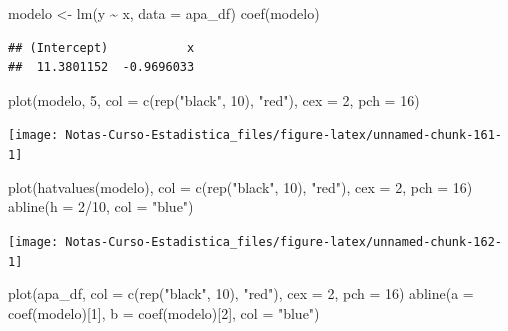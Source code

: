 \documentclass[
  12pt,
]{book}
\newenvironment{Shaded}{\begin{snugshade}}{\end{snugshade}}
\newcommand{\AttributeTok}[1]{\textcolor[rgb]{0.77,0.63,0.00}{#1}}
\newcommand{\DecValTok}[1]{\textcolor[rgb]{0.00,0.00,0.81}{#1}}
\newcommand{\FunctionTok}[1]{\textcolor[rgb]{0.00,0.00,0.00}{#1}}
\newcommand{\NormalTok}[1]{#1}
\newcommand{\OtherTok}[1]{\textcolor[rgb]{0.56,0.35,0.01}{#1}}
\newcommand{\SpecialCharTok}[1]{\textcolor[rgb]{0.00,0.00,0.00}{#1}}
\newcommand{\StringTok}[1]{\textcolor[rgb]{0.31,0.60,0.02}{#1}}
\begin{document}
\begin{Shaded}
\begin{Highlighting}[]
\NormalTok{modelo }\OtherTok{\textless{}{-}} \FunctionTok{lm}\NormalTok{(y }\SpecialCharTok{\textasciitilde{}}\NormalTok{ x, }\AttributeTok{data =}\NormalTok{ apa\_df)}
\FunctionTok{coef}\NormalTok{(modelo)}
\end{Highlighting}
\end{Shaded}

\begin{verbatim}
## (Intercept)           x 
##  11.3801152  -0.9696033
\end{verbatim}

\begin{Shaded}
\begin{Highlighting}[]
\FunctionTok{plot}\NormalTok{(modelo, }\DecValTok{5}\NormalTok{, }\AttributeTok{col =} \FunctionTok{c}\NormalTok{(}\FunctionTok{rep}\NormalTok{(}\StringTok{"black"}\NormalTok{, }\DecValTok{10}\NormalTok{), }\StringTok{"red"}\NormalTok{), }\AttributeTok{cex =} \DecValTok{2}\NormalTok{,}
    \AttributeTok{pch =} \DecValTok{16}\NormalTok{)}
\end{Highlighting}
\end{Shaded}

\begin{center}\texttt{[image: Notas-Curso-Estadistica\_files/figure-latex/unnamed-chunk-161-1]} \end{center}

\begin{Shaded}
\begin{Highlighting}[]
\FunctionTok{plot}\NormalTok{(}\FunctionTok{hatvalues}\NormalTok{(modelo), }\AttributeTok{col =} \FunctionTok{c}\NormalTok{(}\FunctionTok{rep}\NormalTok{(}\StringTok{"black"}\NormalTok{, }\DecValTok{10}\NormalTok{), }\StringTok{"red"}\NormalTok{),}
    \AttributeTok{cex =} \DecValTok{2}\NormalTok{, }\AttributeTok{pch =} \DecValTok{16}\NormalTok{)}
\FunctionTok{abline}\NormalTok{(}\AttributeTok{h =} \DecValTok{2}\SpecialCharTok{/}\DecValTok{10}\NormalTok{, }\AttributeTok{col =} \StringTok{"blue"}\NormalTok{)}
\end{Highlighting}
\end{Shaded}

\begin{center}\texttt{[image: Notas-Curso-Estadistica\_files/figure-latex/unnamed-chunk-162-1]} \end{center}

\begin{Shaded}
\begin{Highlighting}[]
\FunctionTok{plot}\NormalTok{(apa\_df, }\AttributeTok{col =} \FunctionTok{c}\NormalTok{(}\FunctionTok{rep}\NormalTok{(}\StringTok{"black"}\NormalTok{, }\DecValTok{10}\NormalTok{), }\StringTok{"red"}\NormalTok{), }\AttributeTok{cex =} \DecValTok{2}\NormalTok{,}
    \AttributeTok{pch =} \DecValTok{16}\NormalTok{)}
\FunctionTok{abline}\NormalTok{(}\AttributeTok{a =} \FunctionTok{coef}\NormalTok{(modelo)[}\DecValTok{1}\NormalTok{], }\AttributeTok{b =} \FunctionTok{coef}\NormalTok{(modelo)[}\DecValTok{2}\NormalTok{], }\AttributeTok{col =} \StringTok{"blue"}\NormalTok{)}
\end{Highlighting}
\end{Shaded}
\end{document}
